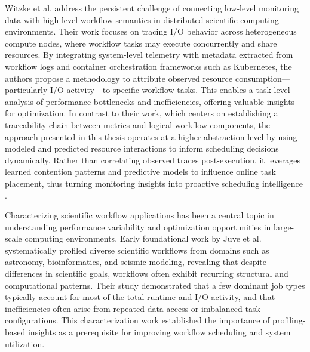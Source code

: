 Witzke et al. address the persistent challenge of connecting low-level monitoring data with high-level workflow semantics in distributed scientific computing environments. Their work focuses on tracing I/O behavior across heterogeneous compute nodes, where workflow tasks may execute concurrently and share resources. By integrating system-level telemetry with metadata extracted from workflow logs and container orchestration frameworks such as Kubernetes, the authors propose a methodology to attribute observed resource consumption—particularly I/O activity—to specific workflow tasks. This enables a task-level analysis of performance bottlenecks and inefficiencies, offering valuable insights for optimization. In contrast to their work, which centers on establishing a traceability chain between metrics and logical workflow components, the approach presented in this thesis operates at a higher abstraction level by using modeled and predicted resource interactions to inform scheduling decisions dynamically. Rather than correlating observed traces post-execution, it leverages learned contention patterns and predictive models to influence online task placement, thus turning monitoring insights into proactive scheduling intelligence \cite{Witzke2024}.

Characterizing scientific workflow applications has been a central topic in understanding performance variability and optimization opportunities in large-scale computing environments. Early foundational work by Juve et al. systematically profiled diverse scientific workflows from domains such as astronomy, bioinformatics, and seismic modeling, revealing that despite differences in scientific goals, workflows often exhibit recurring structural and computational patterns. Their study demonstrated that a few dominant job types typically account for most of the total runtime and I/O activity, and that inefficiencies often arise from repeated data access or imbalanced task configurations. This characterization work established the importance of profiling-based insights as a prerequisite for improving workflow scheduling and system utilization.

